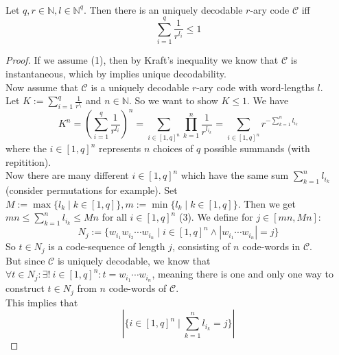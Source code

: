 \documentclass[12pt]{article}
\newenvironment{statement3}[3]{\begin{trivlist}
\item[\hskip \labelsep {\bfseries #1}\hskip \labelsep {\bfseries #2} {#3}\textbf{.}]}{\end{trivlist}}
\begin{document}
\begin{statement3}{(1.8)}{Theorem}{(McMillan's Inequality)}\strut\\[2pt]
    Let $q,r \in \mathbb{N}, l \in \mathbb{N}^q$. Then there is an uniquely decodable
    $r$-ary code $\mathcal{C}$ iff
    \begin{equation}
        \sum_{i=1}^{q} \frac{1}{r^{l_i}} \leq 1 \tag{1}
    \end{equation}

    \begin{proof}
        If we assume (1), then by Kraft's inequality we know that $\mathcal{C}$
        is instantaneous, which by \cite{ICT} implies unique decodability.\\[10pt]
        Now assume that $\mathcal{C}$ is a uniquely decodable $r$-ary code with word-lengths
        $l$.\\
        Let
        $
            K := \sum_{i=1}^{q} \frac{1}{r^{l_i}}
        $ and $n \in \mathbb{N}$. So we want to show $K \leq 1$.
        We have
        \begin{equation}
            K^n
            = \left(\sum_{i=1}^{q} \frac{1}{r^{l_i}}\right)^n
            = \sum_{i \in [1,q]^n}\prod_{k=1}^{n} \frac{1}{r^{l_{i_k}}}
            = \sum_{i \in [1,q]^n} r^{-\sum_{k=1}^{n} l_{i_k}} \tag{2}
        \end{equation}
        where the $i \in [1,q]^n$ represents $n$ choices of $q$ possible summands (with repitition).\\[10pt]
        Now there are many different $i \in [1,q]^n$ which have the same sum $\sum_{k=1}^{n} l_{i_k}$
        (consider permutations for example). Set $M := \max\{l_k\mid k \in [1,q]\}, m := \min\{l_k \mid k \in [1,q]\}$.
        Then we get $mn \leq \sum_{k=1}^{n} l_{i_k} \leq Mn$ for all $i \in [1,q]^n$ (3). We define for
        $j \in [mn,Mn]$:
        $$
            N_{j} := \{w_{i_1}w_{i_2}\cdots w_{i_n} \mid i \in [1,q]^n \land |w_{i_1}\cdots w_{i_n}| = j \}
        $$
        So $t \in N_{j}$ is a code-sequence of length $j$, consisting of $n$ code-words in $\mathcal{C}$.\\
        But since $\mathcal{C}$ is uniquely decodable, we know that
        $
            \forall t \in N_{j}: \exists!\ i \in [1,q]^n: t = w_{i_1}\cdots w_{i_n}
        $,
        meaning there is one and only one way to construct $t \in N_{j}$ from $n$ code-words of $\mathcal{C}$.\\
        This implies that
        \begin{equation}
            |\{i \in [1,q]^n \mid \sum_{k=1}^{n} l_{i_k} = j\}|

\end{equation}
\end{proof}
\end{statement3}
\end{document}
